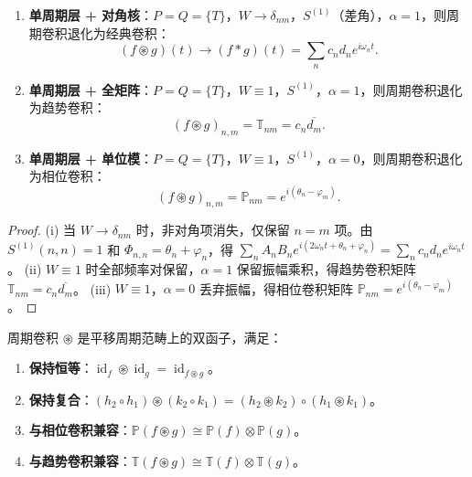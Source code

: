 \begin{proposition}[周期卷积的退化情形]\label{prop:periodic_convolution_degenerations}
\begin{enumerate}[label=(\roman*)]
    \item \textbf{单周期层 + 对角核}：$P = Q = \{T\}$，$W \to \delta_{nm}$，$S^{(1)}$（差角），$\alpha = 1$，则周期卷积退化为经典卷积：
    \[
    (f \circledast g)(t) \to (f * g)(t) = \sum_n c_n d_n e^{i\omega_n t}.
    \]
    \item \textbf{单周期层 + 全矩阵}：$P = Q = \{T\}$，$W \equiv 1$，$S^{(1)}$，$\alpha = 1$，则周期卷积退化为趋势卷积：
    \[
    (f \circledast g)_{n,m} = \mathbb{T}_{nm} = c_n \overline{d_m}.
    \]
    \item \textbf{单周期层 + 单位模}：$P = Q = \{T\}$，$W \equiv 1$，$S^{(1)}$，$\alpha = 0$，则周期卷积退化为相位卷积：
    \[
    (f \circledast g)_{n,m} = \mathbb{P}_{nm} = e^{i(\theta_n - \varphi_m)}.
    \]
\end{enumerate}
\end{proposition}

\begin{proof}
(i) 当 $W \to \delta_{nm}$ 时，非对角项消失，仅保留 $n = m$ 项。由 $S^{(1)}(n,n) = 1$ 和 $\Phi_{n,n} = \theta_n + \varphi_n$，得 $\sum_n A_n B_n e^{i(2\omega_n t + \theta_n + \varphi_n)} = \sum_n c_n d_n e^{i\omega_n t}$。
(ii) $W \equiv 1$ 时全部频率对保留，$\alpha = 1$ 保留振幅乘积，得趋势卷积矩阵 $\mathbb{T}_{nm} = c_n \overline{d_m}$。
(iii) $W \equiv 1$，$\alpha = 0$ 丢弃振幅，得相位卷积矩阵 $\mathbb{P}_{nm} = e^{i(\theta_n - \varphi_m)}$。
\end{proof}

\begin{theorem}[周期卷积的函子性]\label{thm:periodic_convolution_functoriality_series}
周期卷积 $\circledast$ 是平移周期范畴上的双函子，满足：
\begin{enumerate}[label=(\roman*)]
    \item \textbf{保持恒等}：$\operatorname{id}_f \circledast \operatorname{id}_g = \operatorname{id}_{f \circledast g}$。
    \item \textbf{保持复合}：$(h_2 \circ h_1) \circledast (k_2 \circ k_1) = (h_2 \circledast k_2) \circ (h_1 \circledast k_1)$。
    \item \textbf{与相位卷积兼容}：$\mathbb{P}(f \circledast g) \cong \mathbb{P}(f) \otimes \mathbb{P}(g)$。
    \item \textbf{与趋势卷积兼容}：$\mathbb{T}(f \circledast g) \cong \mathbb{T}(f) \otimes \mathbb{T}(g)$。
\end{enumerate}
\end{theorem}

